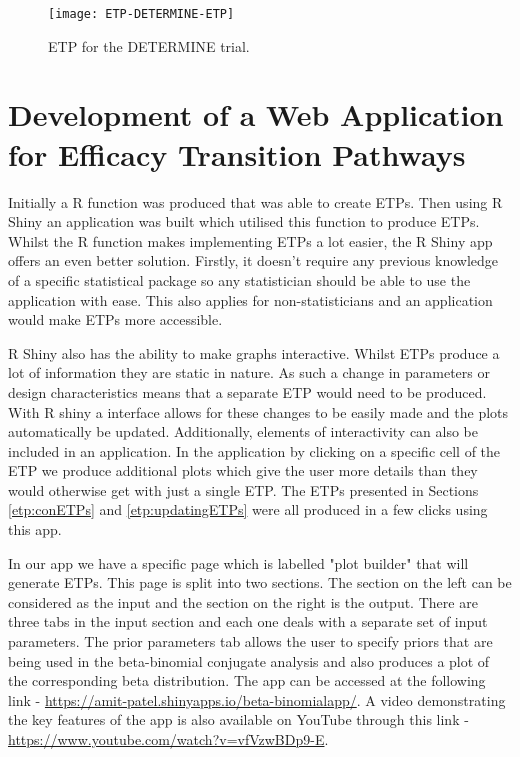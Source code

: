 \begin{sidewaysfigure}[h!]
	\centering
	\caption{ETP for the DETERMINE trial.}
	\label{fig_etp:DETERMINE-ETP}
	\texttt{[image: ETP-DETERMINE-ETP]}
\end{sidewaysfigure} 

\clearpage


\section{Development of a Web Application for Efficacy Transition Pathways}

Initially a R function was produced that was able to create ETPs. Then using R Shiny an application was built which utilised this function to produce ETPs. Whilst the R function makes implementing ETPs a lot easier, the R Shiny app offers an even better solution. Firstly, it doesn't require any previous knowledge of a specific statistical package so any statistician should be able to use the application with ease. This also applies for non-statisticians and an application would make ETPs more accessible. 

R Shiny also has the ability to make graphs interactive. Whilst ETPs produce a lot of information they are static in nature. As such a change in parameters or design characteristics means that a separate ETP would need to be produced. With R shiny a interface allows for these changes to be easily made and the plots automatically be updated. Additionally, elements of interactivity can also be included in an application. In the application by clicking on a specific cell of the ETP we produce additional plots which give the user more details than they would otherwise get with just a single ETP. The ETPs presented in Sections \ref{etp:conETPs} and \ref{etp:updatingETPs} were all produced in a few clicks using this app. 

In our app we have a specific page which is labelled "plot builder" that will generate ETPs. This page is split into two sections. The section on the left can be considered as the input and the section on the right is the output. There are three tabs in the input section and each one deals with a separate set of input parameters. The prior parameters tab allows the user to specify priors that are being used in the beta-binomial conjugate analysis and also produces a plot of the corresponding beta distribution. The app can be accessed at the following link - \href{ https://amit-patel.shinyapps.io/beta-binomialapp/}{https://amit-patel.shinyapps.io/beta-binomialapp/}. A video demonstrating the key features of the app is also available on YouTube through this link - \href{ https://www.youtube.com/watch?v=vfVzwBDp9-E}{https://www.youtube.com/watch?v=vfVzwBDp9-E}.

